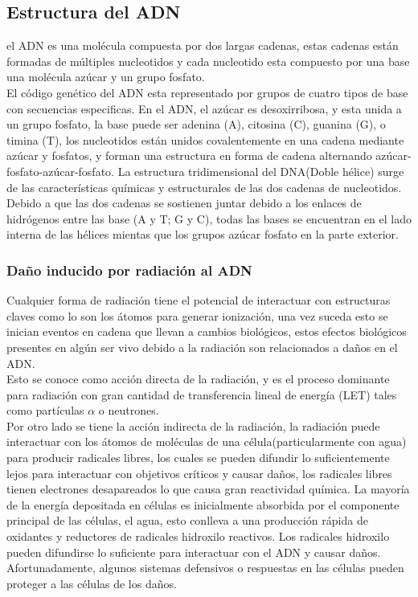 \subsection{Estructura del ADN}
el ADN es una molécula compuesta por dos largas cadenas, estas cadenas están formadas de múltiples nucleotidos y cada nucleotido esta compuesto por una base una molécula azúcar y un grupo fosfato.\\
El código genético del ADN esta representado por grupos de cuatro tipos de base con secuencias especificas. En el ADN, el azúcar es desoxirribosa, y esta unida a un grupo fosfato,  la base puede ser adenina (A), citosina (C), guanina (G), o timina (T), los nucleotidos están unidos covalentemente en una cadena mediante azúcar y fosfatos, y forman una estructura en forma de cadena alternando azúcar-fosfato-azúcar-fosfato. La estructura tridimensional del DNA(Doble hélice) surge de las características químicas y estructurales de las dos cadenas de nucleotidos. Debido a que las dos cadenas se sostienen juntar debido a los enlaces de hidrógenos entre las base (A y T; G y C), todas las bases se encuentran en el lado interna de las hélices mientas que los grupos azúcar fosfato en la parte exterior\cite{rescells}.

\subsubsection{Daño inducido por radiación al ADN}

 Cualquier forma de radiación tiene el potencial de interactuar con estructuras claves como lo son los átomos para generar ionización, una vez suceda esto se inician eventos en cadena que llevan a cambios biológicos, estos efectos biológicos presentes en algún ser vivo debido a la radiación son relacionados a daños en el ADN.\\
 Esto se conoce como  acción directa de la radiación, y es el proceso dominante para radiación con gran cantidad de transferencia lineal de energía (LET) tales como partículas $\alpha$ o neutrones\cite{rescells}.\\

Por otro lado se tiene la acción indirecta de la radiación, la radiación puede interactuar con los átomos de moléculas de una célula(particularmente con agua) para producir radicales libres, los cuales se pueden difundir lo suficientemente lejos para interactuar con objetivos críticos y causar daños, los radicales libres tienen electrones desapareados lo que causa gran reactividad química. La mayoría de la energía  depositada en células es inicialmente absorbida por el componente principal de las células, el agua, esto conlleva a una producción rápida de
oxidantes y reductores de radicales hidroxilo reactivos. Los radicales hidroxilo pueden difundirse lo suficiente para interactuar con el ADN y causar daños. Afortunadamente, algunos sistemas defensivos o respuestas en las células pueden proteger a las células de los daños\cite{rescells}.\\
\\\

